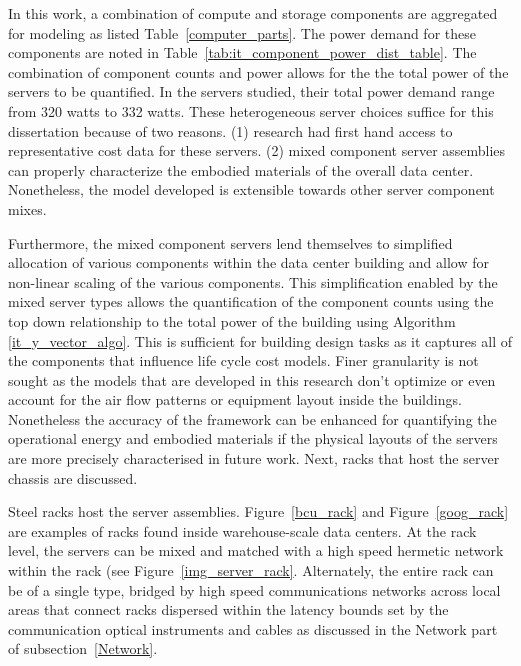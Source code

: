             
            
            In this work, a combination of compute and storage components are aggregated for modeling as listed Table~\ref{computer_parts}. The power demand for these components are noted in Table~\ref{tab:it_component_power_dist_table}. The combination of component counts and power allows for the the total power of the servers to be quantified. In the servers studied, their total power demand range from 320 watts to 332 watts.  These heterogeneous server choices suffice for this dissertation because of two reasons. (1) research had first hand access to representative cost data for these servers. (2) mixed component server assemblies can properly characterize the embodied materials of the overall data center. Nonetheless, the model developed is extensible towards other server component mixes. 
             
            
            Furthermore, the mixed component servers lend themselves to simplified allocation of various components within the data center building and allow for non-linear scaling of the various components. This simplification enabled by the mixed server types allows the quantification of the component counts using the top down relationship to the total power of the building using Algorithm~ \ref{it_y_vector_algo}. This is sufficient for building design tasks as it captures all of the components that influence life cycle cost models. Finer granularity is not sought as the models that are developed in this research don't optimize or even account for the air flow patterns or equipment layout inside the buildings. Nonetheless the accuracy of the framework can be enhanced for quantifying the operational energy and embodied materials if the physical layouts of the servers are more precisely characterised in future work. Next, racks that host the server chassis are discussed.
            
            
            Steel racks host the server assemblies. Figure~\ref{bcu_rack} and Figure~\ref{goog_rack} are examples of racks found inside warehouse-scale data centers. At the rack level, the servers can be mixed and matched with a high speed hermetic network within the rack (see Figure~\ref{img_server_rack}. Alternately, the entire rack can be of a single type, bridged by high speed communications networks across local areas that connect racks dispersed within the  latency bounds set by the communication optical instruments and cables as  discussed in the Network part of subsection~\ref{Network}. 
            
